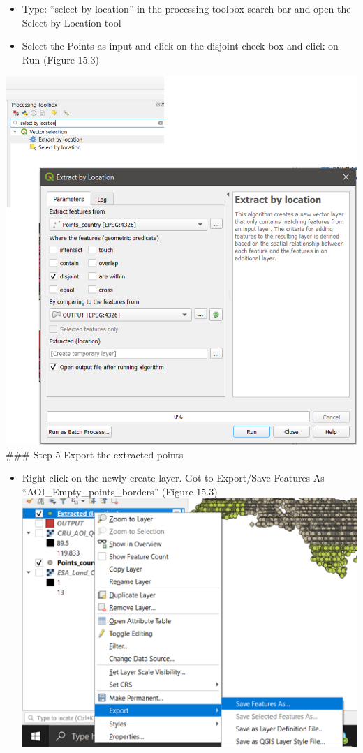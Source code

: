 \documentclass[
  10pt,
  b5paper,
]{book}
\providecommand{\tightlist}{%
  \setlength{\itemsep}{0pt}\setlength{\parskip}{0pt}}
\begin{document}
\begin{itemize}
\tightlist
\item
  Type: ``select by location'' in the processing toolbox search bar and open the Select by Location tool
\item
  Select the Points as input and click on the disjoint check box and click on Run (Figure 15.3)
\end{itemize}

\includegraphics{images/Figure_12.png}
\#\#\# Step 5 Export the extracted points

\begin{itemize}
\tightlist
\item
  Right click on the newly create layer. Got to Export/Save Features As ``AOI\_Empty\_points\_borders'' (Figure 15.3)
  \includegraphics{images/Figure_13.png}
\end{itemize}
\end{document}
